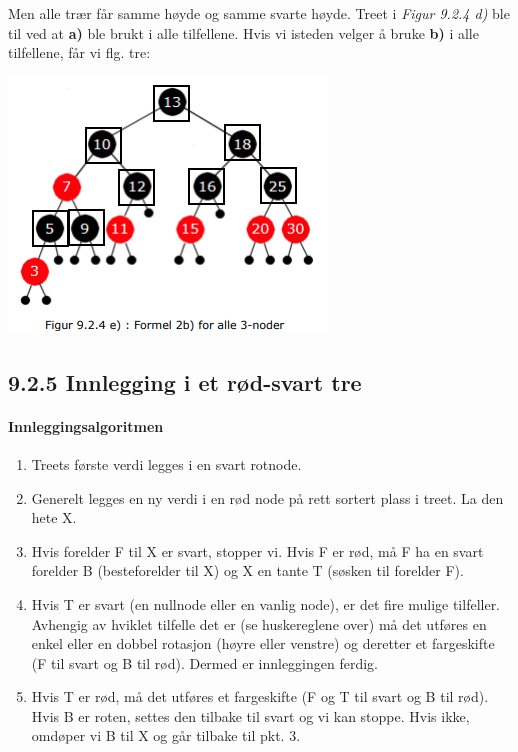 \documentclass[11pt]{article}
\begin{document}
        \begin{multicols}{2}
            Men alle trær får samme høyde og samme svarte høyde.
            Treet i \emph{Figur 9.2.4 d)} ble til ved at \textbf{a)} ble brukt i alle tilfellene.
            Hvis vi isteden velger å bruke \textbf{b)} i alle tilfellene, får vi flg. tre:

            \includegraphics[center]{figur-9.2.4e.png}
        \end{multicols}

\newpage

    \subsection{9.2.5 Innlegging i et rød-svart tre}
        \paragraph{Innleggingsalgoritmen}
        \begin{enumerate}
            \item Treets første verdi legges i en svart rotnode.
            \item  Generelt legges en ny verdi i en rød node på rett sortert plass i treet. La den hete X.
            \item Hvis forelder F til X er svart, stopper vi. Hvis F er rød, må F ha en svart forelder B
                (besteforelder til X) og X en tante T (søsken til forelder F).
            \item Hvis T er svart (en nullnode eller en vanlig node), er det fire mulige tilfeller. Avhengig
                av hviklet tilfelle det er (se huskereglene over) må det utføres en enkel eller en dobbel
                rotasjon (høyre eller venstre) og deretter et fargeskifte (F til svart og B til rød). Dermed
                er innleggingen ferdig.
            \item Hvis T er rød, må det utføres et fargeskifte (F og T til svart og B til rød). Hvis B er
                roten, settes den tilbake til svart og vi kan stoppe. Hvis ikke, omdøper vi B til X og går
                tilbake til pkt. 3.
        \end{enumerate}
\end{document}
